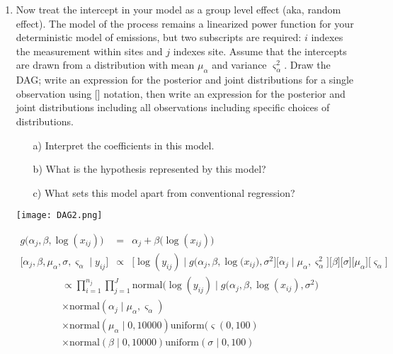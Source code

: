 \documentclass[12pt, oneside]{article}
\newif\ifanswers
\begin{document}
\begin{enumerate} [leftmargin=*]
\ifanswers
What are assuming about the distribution of the untransformed $\mu_i$?  It is lognormal. Be sure you understand this.
\fi

\newpage

\item Now treat the intercept in your model as a group level effect (aka, random effect). The model of the process remains a linearized power function for your deterministic model of emissions, but two subscripts are required: $i$ indexes the measurement within sites and $j$ indexes site. Assume that the intercepts are drawn from a distribution with mean $\mu_{\alpha}$ and variance $\varsigma_{\alpha}^2$. Draw the DAG; write an expression for the posterior and joint distributions for a single observation using [] notation, then write an expression for the posterior and joint distributions including all observations including specific choices of distributions. 

\begin{enumerate}
         \item[a)] Interpret the coefficients in this model.
         \item[b)] What is the hypothesis represented by this model?
         \item[c)] What sets this model apart from conventional regression?
\end{enumerate}

\ifanswers
\newpage
\begin{center}
\texttt{[image: DAG2.png]}
\end{center}

\begin{eqnarray*}
g\big(\alpha_{j},\beta,\log(x_{ij})\big)&=& \alpha_{j}+\beta\big(\log(x_{ij})\big)\\
\big[\alpha_{j},\beta,\mu_{\alpha},\sigma,\varsigma_{\alpha}\mid y_{ij}\big] & \propto & \big[\log(y_{ij})\mid g\big(\alpha_{j},\beta,\log(x_{ij}\big),\sigma^{2}\big]\big[\alpha_{j}\mid\mu_{\alpha},\varsigma_{\alpha}^{2}\big]\big[\beta\big]\big[\sigma\big]\big[\mu_{\alpha}\big]\big[\varsigma_{\alpha}\big]\label{eq:mean model for N02 intecept}\
\end{eqnarray*}
\begin{align*}
[\bm{\alpha},\beta,\sigma,\mu_\alpha,\varsigma_\alpha \mid \mathbf{y}]&\propto \prod_{i=1}^{n_j} \prod_{j=1}^{J}\text{normal}(\log(y_{ij})\mid g\big(\alpha_j,\beta,\log(x_{ij}),\sigma^2\big)\\
&\times \text{normal}(\alpha_j \mid\mu_{\alpha},\varsigma_{\alpha})\\
&\times\text{normal}(\mu_{\alpha}\mid 0,10000)\text{uniform}(\varsigma(0,100)\\
&\times\text{normal}(\beta \mid 0,10000)\text{uniform}(\sigma\mid0,100)
\end{align*}


\end{enumerate}
\end{document}

